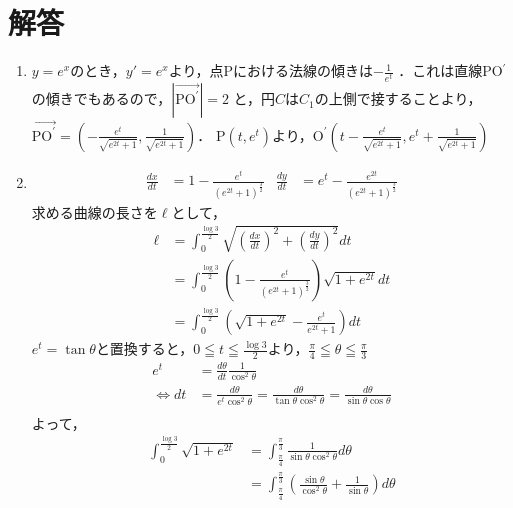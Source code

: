 \documentclass[a3paper,twocolumn,fleqn]{ltjsarticle}
\begin{document}
\section{解答}
\begin{enumerate}[(1)]
    \item $y=e^x$のとき，$y'=e^x$より，点Pにおける法線の傾きは$\displaystyle -\frac{1}{e^t}$ ．これは直線PO$^\prime$の傾きでもあるので，$\left| \overrightarrow{\mbox{PO}^\prime} \right| = 2$ と，円$C$は$C_1$の上側で接することより，\\
    $\displaystyle \overrightarrow{\mbox{PO}^\prime} = \left( -\frac{e^t}{\sqrt{e^{2t}+1}} , \frac{1}{\sqrt{e^{2t}+1}}\right)$．
    P$(t,e^t)$より，$\displaystyle \mbox{O}^\prime \left( t - \frac{e^t}{\sqrt{e^{2t}+1}} , e^t + \frac{1}{\sqrt{e^{2t}+1}}\right)$\\
    \item 
    \begin{align*}
        \frac{dx}{dt} &= 1-\frac{e^t}{{\left( e^{2t}+1 \right)}^\frac{3}{2}} & \frac{dy}{dt} &= e^t - \frac{e^{2t}}{{\left( e^{2t}+1 \right)}^\frac{3}{2}}
    \end{align*}
    求める曲線の長さを$\ell$として，
    \begin{align*}
        \ell &= \int_{0}^{\frac{\log3}{2}}\sqrt{\left( \frac{dx}{dt} \right)^2 + \left( \frac{dy}{dt} \right)^2} dt\\
        &= \int_{0}^{\frac{\log3}{2}} \left(1 - \frac{e^t}{\left(e^{2t} + 1\right)^\frac{3}{2}}\right)\sqrt{1+e^{2t}} dt\\
        &= \int_{0}^{\frac{\log3}{2}} \left(\sqrt{1+e^{2t}} - \frac{e^t}{e^{2t} + 1}\right) dt
    \end{align*}
    $e^t = \tan\theta$と置換すると，$\displaystyle 0\leqq t\leqq \frac{\log3}{2} $より，$\displaystyle \frac{\pi}{4} \leqq\theta\leqq\frac{\pi}{3}$
    \begin{align*}
        e^t &= \frac{d\theta}{dt}\frac{1}{\cos^2\theta}\\
        \Leftrightarrow dt &= \frac{d\theta}{e^t \cos^2\theta} = \frac{d\theta}{\tan\theta\cos^2\theta}= \frac{d\theta}{\sin\theta\cos\theta}\\
    \end{align*}
    よって，
    \begin{align*}
        \int_{0}^{\frac{\log3}{2}} \sqrt{1+e^{2t}} &= \int^{\frac{\pi}{3}}_{\frac{\pi}{4}} \frac{1}{\sin\theta \cos^2\theta} d\theta\\
        &= \int^{\frac{\pi}{3}}_{\frac{\pi}{4}} \left(\frac{\sin\theta}{\cos^2\theta} + \frac{1}{\sin\theta}\right) d\theta\\

\end{align*}
\end{enumerate}
\end{document}
